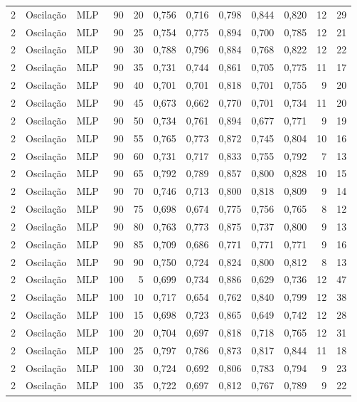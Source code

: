 \begin{longtable}{@{}rllrrrrrrrrr@{}}
2 & Oscilação & MLP & 90 & 20 & 0,756 & 0,716 & 0,798 & 0,844 & 0,820 & 12 & 29 \\
2 & Oscilação & MLP & 90 & 25 & 0,754 & 0,775 & 0,894 & 0,700 & 0,785 & 12 & 21 \\
2 & Oscilação & MLP & 90 & 30 & 0,788 & 0,796 & 0,884 & 0,768 & 0,822 & 12 & 22 \\
2 & Oscilação & MLP & 90 & 35 & 0,731 & 0,744 & 0,861 & 0,705 & 0,775 & 11 & 17 \\
2 & Oscilação & MLP & 90 & 40 & 0,701 & 0,701 & 0,818 & 0,701 & 0,755 & 9 & 20 \\
2 & Oscilação & MLP & 90 & 45 & 0,673 & 0,662 & 0,770 & 0,701 & 0,734 & 11 & 20 \\
2 & Oscilação & MLP & 90 & 50 & 0,734 & 0,761 & 0,894 & 0,677 & 0,771 & 9 & 19 \\
2 & Oscilação & MLP & 90 & 55 & 0,765 & 0,773 & 0,872 & 0,745 & 0,804 & 10 & 16 \\
2 & Oscilação & MLP & 90 & 60 & 0,731 & 0,717 & 0,833 & 0,755 & 0,792 & 7 & 13 \\
2 & Oscilação & MLP & 90 & 65 & 0,792 & 0,789 & 0,857 & 0,800 & 0,828 & 10 & 15 \\
2 & Oscilação & MLP & 90 & 70 & 0,746 & 0,713 & 0,800 & 0,818 & 0,809 & 9 & 14 \\
2 & Oscilação & MLP & 90 & 75 & 0,698 & 0,674 & 0,775 & 0,756 & 0,765 & 8 & 12 \\
2 & Oscilação & MLP & 90 & 80 & 0,763 & 0,773 & 0,875 & 0,737 & 0,800 & 9 & 13 \\
2 & Oscilação & MLP & 90 & 85 & 0,709 & 0,686 & 0,771 & 0,771 & 0,771 & 9 & 16 \\
2 & Oscilação & MLP & 90 & 90 & 0,750 & 0,724 & 0,824 & 0,800 & 0,812 & 8 & 13 \\
2 & Oscilação & MLP & 100 & 5 & 0,699 & 0,734 & 0,886 & 0,629 & 0,736 & 12 & 47 \\
2 & Oscilação & MLP & 100 & 10 & 0,717 & 0,654 & 0,762 & 0,840 & 0,799 & 12 & 38 \\
2 & Oscilação & MLP & 100 & 15 & 0,698 & 0,723 & 0,865 & 0,649 & 0,742 & 12 & 28 \\
2 & Oscilação & MLP & 100 & 20 & 0,704 & 0,697 & 0,818 & 0,718 & 0,765 & 12 & 31 \\
2 & Oscilação & MLP & 100 & 25 & 0,797 & 0,786 & 0,873 & 0,817 & 0,844 & 11 & 18 \\
2 & Oscilação & MLP & 100 & 30 & 0,724 & 0,692 & 0,806 & 0,783 & 0,794 & 9 & 23 \\
2 & Oscilação & MLP & 100 & 35 & 0,722 & 0,697 & 0,812 & 0,767 & 0,789 & 9 & 22 \\

\end{longtable}
